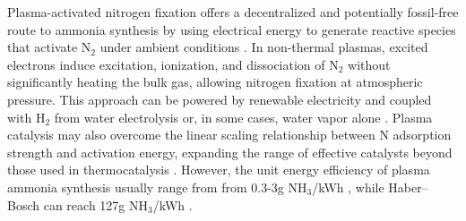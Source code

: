Plasma-activated nitrogen fixation offers a decentralized and potentially fossil-free route to ammonia synthesis by using electrical energy to generate reactive species that activate N$_2$ under ambient conditions \cite{Mehta2019CatalysisReview, Bogaerts2018PlasmaStorage, Zhao2023SustainableInteractions, Gorbanev2024PlasmaIt, Sharma2021PlasmaWater, Gao2023Plasma-ActivatedAeroponics}. In non-thermal plasmas, excited electrons induce excitation, ionization, and dissociation of N$_2$ without significantly heating the bulk gas, allowing nitrogen fixation at atmospheric pressure. This approach can be powered by renewable electricity and coupled with H$_2$ from water electrolysis or, in some cases, water vapor alone \cite{Pfromm2017TowardsAmmonia}. Plasma catalysis may also overcome the linear scaling relationship between N adsorption strength and activation energy, expanding the range of effective catalysts beyond those used in thermocatalysis \cite{Chen2018BeyondTransformations, Mehta2018OvercomingCatalysis, Wang2019Plasma-EnhancedMechanism, Peng2019SustainableCatalysis, Mehta2019CatalysisReview, Patil2015Plasma19002014, Carreon2019PlasmaDirections, Rouwenhorst2020Plasma-drivenElectricity, Rouwenhorst2021Plasma-catalyticPlasma}. However, the unit energy efficiency of plasma ammonia synthesis usually range from from 0.3-3g NH$_3$/kWh \cite{Bai2003PlasmaPressure, Bai2008SynthesisCondition}, while Haber–Bosch can reach 127g NH$_3$/kWh \cite{Patil2015Plasma19002014, Chen2021ReviewTechnology}. 
  


